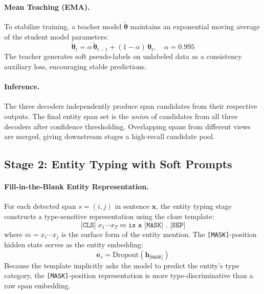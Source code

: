 \documentclass[11pt,a4paper]{article}
\begin{document}
\paragraph{Mean Teaching (EMA).} To stabilize training, a teacher model $\tilde{\boldsymbol{\theta}}$ maintains an exponential moving average of the student model parameters:
\begin{equation}
  \tilde{\boldsymbol{\theta}}_t = \alpha\,\tilde{\boldsymbol{\theta}}_{t-1} + (1-\alpha)\,\boldsymbol{\theta}_t, \quad \alpha = 0.995
\end{equation}
The teacher generates soft pseudo-labels on unlabeled data as a consistency auxiliary loss, encouraging stable predictions.

\paragraph{Inference.} The three decoders independently produce span candidates from their respective outputs. The final entity span set is the \emph{union} of candidates from all three decoders after confidence thresholding. Overlapping spans from different views are merged, giving downstream stages a high-recall candidate pool.

\subsection{Stage 2: Entity Typing with Soft Prompts}

\paragraph{Fill-in-the-Blank Entity Representation.}
For each detected span $s = (i,j)$ in sentence $\mathbf{x}$, the entity typing stage constructs a type-sensitive representation using the cloze template:
\begin{equation}
  \texttt{[CLS]}\; x_1\cdots x_T\; m\; \texttt{is a [MASK] . [SEP]}
  \label{eq:template}
\end{equation}
where $m = x_i\cdots x_j$ is the surface form of the entity mention. The \texttt{[MASK]}-position hidden state serves as the entity embedding:
\begin{equation}
  \mathbf{e}_s = \text{Dropout}(\mathbf{h}_{\texttt{[MASK]}})
\end{equation}
Because the template implicitly asks the model to predict the entity's type category, the \texttt{[MASK]}-position representation is more type-discriminative than a raw span embedding.
\end{document}
